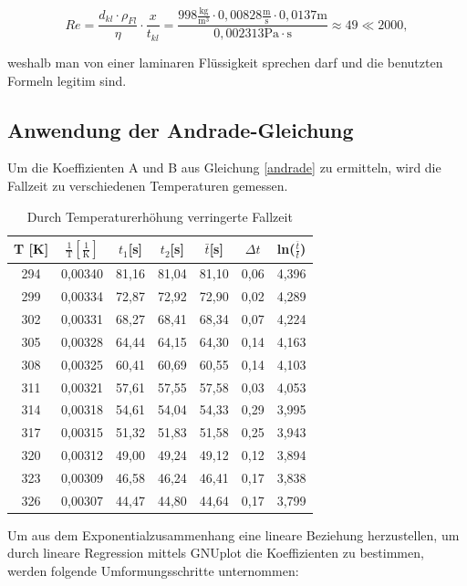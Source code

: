 \begin{equation}
 Re = \frac{d_{kl}\cdot \rho_{Fl}}{\eta} \cdot \frac{x}{t_{kl}}=\frac{998\frac{\text{kg}}{\text{m}^3} \cdot 0,00828\frac{\text{m}}{\text{s}} \cdot 0,0137 \text{m}}{0,002313 \text{Pa}\cdot\text{s}} \approx 49 \ll 2000,
\end{equation}

weshalb man von einer laminaren Flüssigkeit sprechen darf und die benutzten Formeln legitim sind.

\subsection{Anwendung der Andrade-Gleichung}
Um die Koeffizienten A und B aus Gleichung \eqref{andrade} zu ermitteln, wird die Fallzeit zu verschiedenen Temperaturen gemessen.

\renewcommand{\arraystretch}{1.2}
\begin{table}[H]
 \begin{tabular}{c|c|c|c|c|c|c}
   T [K] & $\frac{1}{\text{T}}[\frac{1}{\text{K}}]$& $t_1$[s] & $t_2$[s] & $\bar t$[s] & $\Delta t$ & ln($\frac{\bar t}{t}$)\\	
   \hline
294&	0,00340&	81,16&	81,04&	81,10&	0,06&	4,396 \\
299&	0,00334&	72,87&	72,92&	72,90&	0,02&	4,289\\
302&	0,00331&	68,27&	68,41&	68,34&	0,07&	4,224\\
305&	0,00328&	64,44&	64,15&	64,30&	0,14&	4,163\\
308&	0,00325&	60,41&	60,69&	60,55&	0,14&	4,103\\
311&	0,00321&	57,61&	57,55&	57,58&	0,03&	4,053\\
314&	0,00318&	54,61&	54,04&	54,33&	0,29&	3,995\\
317&	0,00315&	51,32&	51,83&	51,58&	0,25&	3,943\\
320&	0,00312&	49,00&	49,24&	49,12&	0,12&	3,894\\
323&	0,00309&	46,58&	46,24&	46,41&	0,17&	3,838\\
326&	0,00307&	44,47&	44,80&	44,64&	0,17&	3,799
 \end{tabular}
\caption{Durch Temperaturerhöhung verringerte Fallzeit}
\label{tabandrade}
\end{table}
\renewcommand{\arraystretch}{1}

Um aus dem Exponentialzusammenhang eine lineare Beziehung herzustellen, um durch lineare Regression mittels GNUplot
die Koeffizienten zu bestimmen,
werden folgende Umformungsschritte unternommen:

